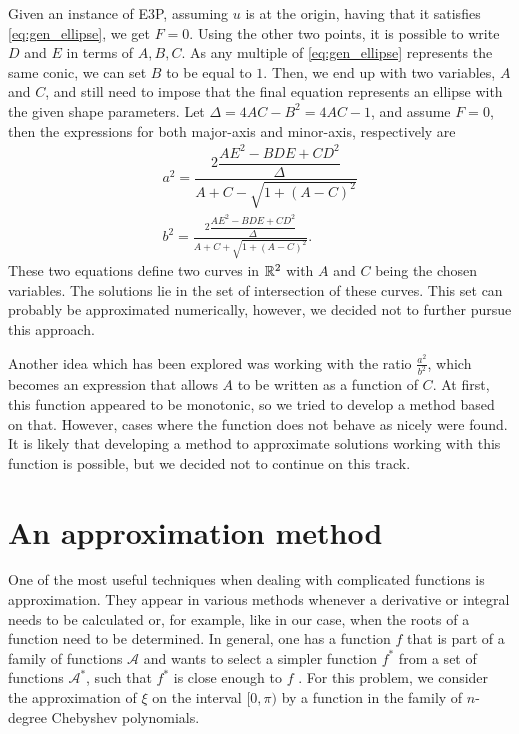 Given an instance of E3P, assuming $u$ is at the origin, having that it satisfies \autoref{eq:gen_ellipse}, we get $F=0$. Using the other two points, it is possible to write $D$ and $E$ in terms of $A, B, C$. As any multiple of \autoref{eq:gen_ellipse} represents the same conic, we can set $B$ to be equal to $1$. Then, we end up with two variables, $A$ and $C$, and still need to impose that the final equation represents an ellipse with the given shape parameters. Let $\Delta=4AC-B^2=4AC-1$, and assume $F=0$, then the expressions for both major-axis and minor-axis, respectively are
\begin{align}\label{eq:gen_ellipse_a}
a^2 = \dfrac{2\dfrac{AE^2 -BDE +CD^2}{\Delta}}{A + C - \sqrt{1 + (A-C)^2}}\\
\label{eq:gen_ellipse_b}b^2 = \frac{2\dfrac{AE^2 -BDE +CD^2}{\Delta}}{A + C + \sqrt{1 + (A-C)^2}}.
\end{align}
These two equations define two curves in $\mathbb{R}^2$ with $A$ and $C$ being the chosen variables. The solutions lie in the set of intersection of these curves. This set can probably be approximated numerically, however, we decided not to further pursue this approach.

Another idea which has been explored was working with the ratio $\frac{a^2}{b^2}$, which becomes an expression that allows $A$ to be written as a function of $C$. At first, this function appeared to be monotonic, so we tried to develop a method based on that. However, cases where the function does not behave as nicely were found. It is likely that developing a method to approximate solutions working with this function is possible, but we decided not to continue on this track.


\section{An approximation method}

One of the most useful techniques when dealing with complicated functions is approximation. They appear in various methods whenever a derivative or integral needs to be calculated or, for example, like in our case, when the roots of a function need to be determined. In general, one has a function $f$ that is part of a family of functions $\mathcal{A}$ and wants to select a simpler function $f^*$ from a set of functions $\mathcal{A^*}$, such that $f^*$ is close enough to $f$ \cite[p.~3]{powell}. For this problem, we consider the approximation of $\xi$ on the interval $[0, \pi)$ by a function in the family of $n$-degree Chebyshev polynomials.

